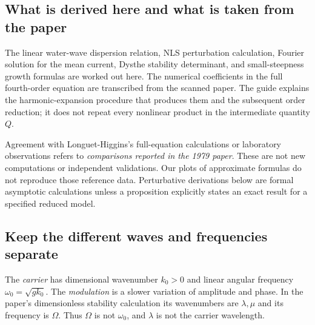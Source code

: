 \subsection{What is derived here and what is taken from the paper}
The linear water-wave dispersion relation, NLS perturbation calculation,
Fourier solution for the mean current, Dysthe stability determinant, and
small-steepness growth formulas are worked out here. The numerical
coefficients in the full fourth-order equation are transcribed from the
scanned paper. The guide explains the harmonic-expansion procedure that
produces them and the subsequent order reduction; it does not repeat
every nonlinear product in the intermediate quantity $Q$.

Agreement with Longuet-Higgins's full-equation calculations or laboratory
observations refers to \emph{comparisons reported in the 1979 paper}.
These are not new computations or independent validations. Our plots of
approximate formulas do not reproduce those reference data. Perturbative
derivations below are formal asymptotic calculations unless a proposition
explicitly states an exact result for a specified reduced model.

\subsection{Keep the different waves and frequencies separate}
The \emph{carrier} has dimensional wavenumber $k_0>0$ and linear angular
frequency $\omega_0=\sqrt{gk_0}$. The \emph{modulation} is a slower
variation of amplitude and phase. In the paper's dimensionless stability
calculation its wavenumbers are $\lambda,\mu$ and its frequency is $\Omega$.
Thus $\Omega$ is not $\omega_0$, and $\lambda$ is not the carrier wavelength.

